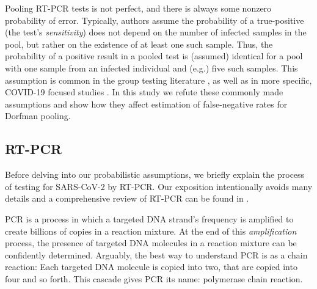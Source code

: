 \documentclass{article}
\begin{document}
Pooling RT-PCR tests is not perfect, and there is always some nonzero
probability of error. Typically, authors assume the probability of a
true-positive (the test's \emph{sensitivity}) does not depend on the
number of infected samples in the pool, but rather on the existence of
at least one such sample. Thus, the probability of a positive result
in a pooled test is (assumed) identical for a pool with one sample
from an infected individual and (e.g.) five such samples. This
assumption is common in the group testing literature \cite{Kim,
  OptimalDorfmanPool}, as well as in more specific, COVID-19 focused
studies \cite{Simplistic1, Simplistic2}. In this study we refute these
commonly made assumptions and show how they affect estimation of
false-negative rates for Dorfman pooling.



\subsection{RT-PCR}
Before delving into our probabilistic assumptions, we briefly explain
the process of testing for SARS-CoV-2 by RT-PCR. Our exposition
intentionally avoids many details and a comprehensive review of RT-PCR
can be found in \cite{COVID-RTPCR, PCRBook}.

PCR is a process in which a targeted DNA strand's frequency is
amplified to create billions of copies in a reaction mixture. At the
end of this \emph{amplification} process, the presence of targeted DNA
molecules in a reaction mixture can be confidently
determined. Arguably, the best way to understand PCR is as a chain
reaction: Each targeted DNA molecule is copied into two, that are
copied into four and so forth. This cascade gives PCR its name:
polymerase chain reaction.
\end{document}
